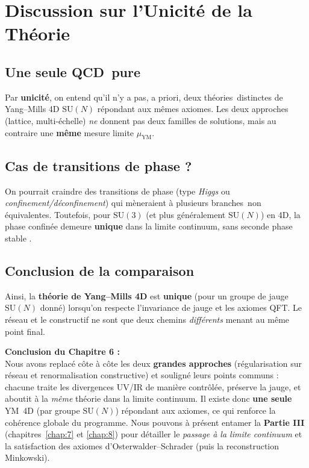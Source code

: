 \section{Discussion sur l’Unicité de la Théorie}
\label{sec:6.3}

\subsection*{Une seule \og QCD\fg\ pure}
Par \textbf{unicité}, on entend qu’il n’y a pas, a priori, deux \og théories\fg\ distinctes de Yang--Mills 4D \(\mathrm{SU}(N)\) répondant aux mêmes axiomes. Les deux approches (lattice, multi-échelle) \emph{ne} donnent pas deux familles de solutions, mais au contraire une \textbf{même} mesure limite \(\mu_{\mathrm{YM}}\).

\subsection*{Cas de transitions de phase ?}
On pourrait craindre des transitions de phase (type \emph{Higgs} ou \emph{confinement/déconfinement}) qui mèneraient à plusieurs \og branches\fg\ non équivalentes. Toutefois, pour \(\mathrm{SU}(3)\) (et plus généralement \(\mathrm{SU}(N)\)) en 4D, la phase confinée demeure \textbf{unique} dans la limite continuum, sans seconde phase stable \cite{Greensite2003}.

\subsection*{Conclusion de la comparaison}
Ainsi, la \textbf{théorie de Yang--Mills 4D} est \textbf{unique} (pour un groupe de jauge \(\mathrm{SU}(N)\) donné) lorsqu’on respecte l’invariance de jauge et les axiomes QFT. Le réseau et le constructif ne sont que deux chemins \emph{différents} menant au même point final.

\vspace{2em}

\noindent
\textbf{Conclusion du Chapitre 6 :}\\
Nous avons replacé côte à côte les deux \textbf{grandes approches} (régularisation sur réseau et renormalisation constructive) et souligné leurs points communs : chacune traite les divergences UV/IR de manière contrôlée, préserve la jauge, et aboutit à la \emph{même} théorie dans la limite continuum. Il existe donc \textbf{une seule} YM~4D (par groupe \(\mathrm{SU}(N)\)) répondant aux axiomes, ce qui renforce la cohérence globale du programme.  
Nous pouvons à présent entamer la \textbf{Partie III} (chapitres~\ref{chap:7} et \ref{chap:8}) pour détailler le \emph{passage à la limite continuum} et la satisfaction des axiomes d’Osterwalder--Schrader (puis la reconstruction Minkowski).

